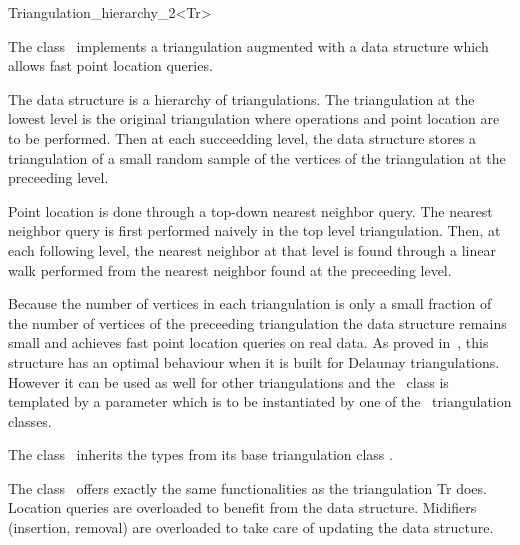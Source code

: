 

\begin{ccRefClass}{Triangulation_hierarchy_2<Tr>}

\ccDefinition
The class \ccRefName\ implements a triangulation augmented with
a data structure which allows fast point location queries.

The data structure is a hierarchy 
of triangulations. The triangulation at the lowest level is
the original triangulation where operations and point location are to 
be performed.
Then at each succeedding level, the data structure
stores a triangulation of a small random sample of the vertices
of the triangulation at the preceeding level. 

Point location
is done through a top-down nearest neighbor query.
The nearest neighbor query is first
performed naively in the top level triangulation.
Then, at each following level, the nearest neighbor at that level
is found through a linear walk performed from
the nearest neighbor found at the preceeding level.

Because the number of vertices in each triangulation is only a small
fraction of the number of vertices of the preceeding triangulation 
the data structure remains small and achieves fast point location 
queries on real
data. As proved in~\cite{d-iirdt-98}, this structure has an optimal behaviour
when it is built for Delaunay triangulations.
However it can be used as well for other triangulations
and the \ccRefName\ class is templated by a parameter
which is to be instantiated by one of the \cgal\ triangulation
classes.


\ccInheritsFrom
{}

\ccTypes
The class \ccRefName\ inherits the types from its base triangulation
class . 

The class \ccRefName\ offers exactly the same functionalities
as the triangulation Tr does.
Location queries are overloaded to benefit from the
data structure. Midifiers (insertion, removal) are overloaded
to take care of updating the data structure.


\end{ccRefClass}
